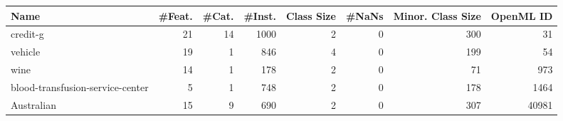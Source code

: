 \begin{tabular}{lrrrrrrr}
\toprule
                                  Name &  \#Feat. &  \#Cat. &  \#Inst. &  Class Size &   \#NaNs &  Minor. Class Size &  OpenML ID \\
\midrule
                              credit-g &      21 &     14 &    1000 &           2 &       0 &                300 &         31 \\
                               vehicle &      19 &      1 &     846 &           4 &       0 &                199 &         54 \\
                                  wine &      14 &      1 &     178 &           2 &       0 &                 71 &        973 \\
      blood-transfusion-service-center &       5 &      1 &     748 &           2 &       0 &                178 &       1464 \\
                            Australian &      15 &      9 &     690 &           2 &       0 &                307 &      40981 \\
\bottomrule
\end{tabular}